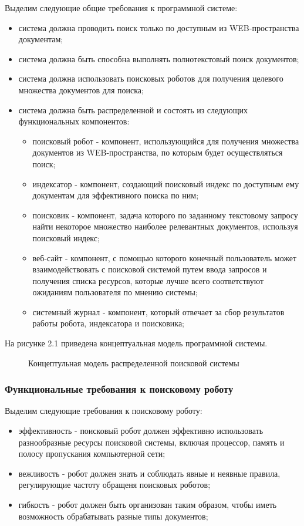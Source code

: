 Выделим следующие общие требования к программной системе:
\begin{itemize}
\item система должна проводить поиск только по доступным из WEB-пространства документам;
\item система должна быть способна выполнять полнотекстовый поиск документов;
\item система должна использовать поисковых роботов для получения целевого множества документов для поиска;
\item система должна быть распределенной и состоять из следующих функциональных компонентов:
\begin{itemize}
\item поисковый робот - компонент, использующийся для получения множества документов из WEB-пространства, по которым будет осуществляться поиск;
\item индексатор - компонент, создающий поисковый индекс по доступным ему документам для эффективного поиска по ним;
\item поисковик - компонент, задача которого по заданному текстовому запросу найти некоторое множество наиболее релевантных документов, используя поисковый индекс;
\item веб-сайт - компонент, с помощью которого конечный пользователь может взаимодействовать с поисковой системой путем ввода запросов и получения списка ресурсов, которые лучше всего соответствуют ожиданиям пользователя по мнению системы;
\item системный журнал - компонент, который отвечает за сбор результатов работы робота, индексатора и поисковика;
\end{itemize}
\end{itemize}

На рисунке 2.1 приведена концептуальная модель программной системы.

\begin{figure}
\caption{Концептульная модель распределенной поисковой системы}
\label{concept_system_model:image}
\end{figure}

\subsubsection{Функциональные требования к поисковому роботу}
Выделим следующие требования к поисковому роботу:
\begin{itemize}
\item эффективность - поисковый робот должен эффективно использовать разнообразные ресурсы поисковой системы, включая процессор, память и полосу пропускания компьютерной сети;
\item вежливость - робот должен знать и соблюдать явные и неявные правила, регулирующие частоту обращеня поисковых роботов;
\item гибкость - робот должен быть организован таким образом, чтобы иметь возможность обрабатывать разные типы документов;
\end{itemize}

